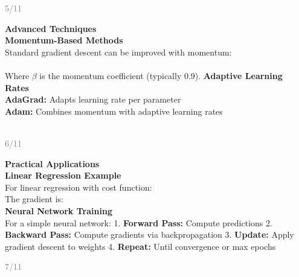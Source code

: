 \documentclass[11pt]{article}
\begin{document}
\vfill
\begin{flushright}
\textcolor{gray}{\small 5/11}
\end{flushright}

\newpage

\textbf{\huge Advanced Techniques}\\[0.5cm]
\textbf{\Large Momentum-Based Methods}\\[0.3cm]
Standard gradient descent can be improved with momentum:
\\[\1\\]
\\[\1\\]
Where $\beta$ is the momentum coefficient (typically 0.9).
\textbf{\Large Adaptive Learning Rates}\\[0.3cm]
\textbf{AdaGrad:} Adapts learning rate per parameter
\\[\1\\]
\textbf{Adam:} Combines momentum with adaptive learning rates
\\[\1\\]
\\[\1\\]

\vfill
\begin{flushright}
\textcolor{gray}{\small 6/11}
\end{flushright}

\newpage

\textbf{\huge Practical Applications}\\[0.5cm]
\textbf{\Large Linear Regression Example}\\[0.3cm]
For linear regression with cost function:
\\[\1\\]
The gradient is:
\\[\1\\]
\textbf{\Large Neural Network Training}\\[0.3cm]
For a simple neural network:
1. \textbf{Forward Pass:} Compute predictions
2. \textbf{Backward Pass:} Compute gradients via backpropagation
3. \textbf{Update:} Apply gradient descent to weights
4. \textbf{Repeat:} Until convergence or max epochs

\vfill
\begin{flushright}
\textcolor{gray}{\small 7/11}
\end{flushright}

\newpage
\end{document}
